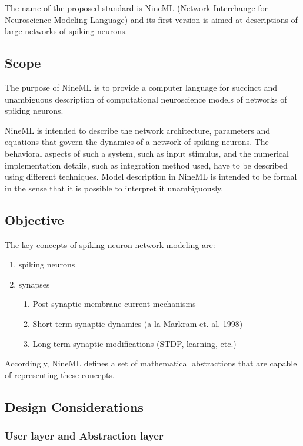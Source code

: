 \documentclass{article}
\begin{document}
The name of the proposed standard is NineML (Network Interchange for
Neuroscience Modeling Language) and its first version is aimed at
descriptions of large networks of spiking neurons.

\subsection{Scope}

The purpose of NineML is to provide a computer language for
succinct and unambiguous description of computational neuroscience models of
networks of spiking neurons.

NineML is intended to describe the network architecture, parameters
and equations that govern the dynamics of a network of spiking
neurons. The behavioral aspects of such a system, such as input
stimulus, and the numerical implementation details, such as
integration method used, have to be described using different
techniques.  Model description in NineML is intended to be formal in
the sense that it is possible to interpret it unambiguously.

\subsection{Objective}

The key concepts of spiking neuron network modeling are:

\begin{enumerate}
\item spiking neurons
\item synapses
\begin{enumerate}
\item Post-synaptic membrane current mechanisms
\item Short-term synaptic dynamics (a la Markram et. al. 1998)
\item Long-term synaptic modifications (STDP, learning, etc.)
\end{enumerate}
\end{enumerate}

Accordingly, NineML defines a set of mathematical abstractions that
are capable of representing these concepts.

\subsection{Design Considerations}

\subsubsection{User layer and Abstraction layer}
\end{document}
